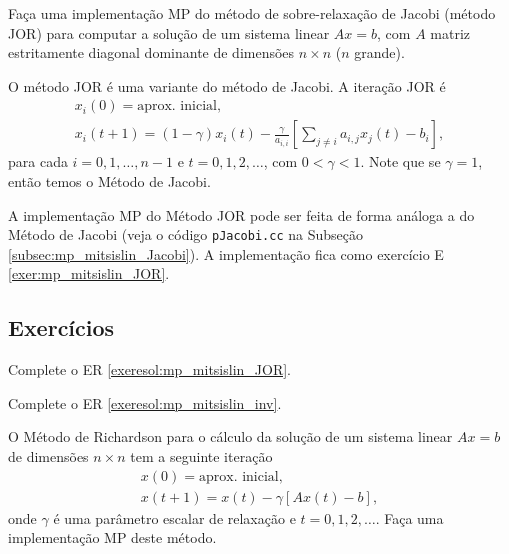 \begin{exeresol}\label{exeresol:mp_mitsislin_JOR}
  Faça uma implementação MP do método de sobre-relaxação de Jacobi (método JOR) para computar a solução de um sistema linear $Ax = b$, com $A$ matriz estritamente diagonal dominante de dimensões $n\times n$ ($n$ grande).
\end{exeresol}
\begin{resol}
  O método JOR é uma variante do método de Jacobi. A iteração JOR é
  \begin{gather}
    x_i(0) = \text{aprox. inicial},\\
    x_i(t+1) = (1-\gamma)x_i(t) -\frac{\gamma}{a_{i,i}}\left[\sum_{j\neq i}a_{i,j}x_j(t) - b_i\right],
  \end{gather}
  para cada $i=0,1,\dotsc,n-1$ e $t=0,1,2,\ldots$, com $0<\gamma<1$. Note que se $\gamma=1$, então temos o Método de Jacobi.

  A implementação MP do Método JOR pode ser feita de forma análoga a do Método de Jacobi (veja o código \verb+pJacobi.cc+ na Subseção \ref{subsec:mp_mitsislin_Jacobi}). A implementação fica como exercício E \ref{exer:mp_mitsislin_JOR}.
\end{resol}

\subsection*{Exercícios}

\begin{exer}\label{exer:mp_mitsislin_JOR}
  Complete o ER \ref{exeresol:mp_mitsislin_JOR}.
\end{exer}

\begin{exer}\label{exer:mp_mitsislin_inv}
  Complete o ER \ref{exeresol:mp_mitsislin_inv}.
\end{exer}

\begin{exer}
  O Método de Richardson para o cálculo da solução de um sistema linear $Ax = b$ de dimensões $n\times n$ tem a seguinte iteração
  \begin{gather}
    x(0) = \text{aprox. inicial},\\
    x(t+1) = x(t) - \gamma\left[Ax(t) - b\right],
  \end{gather}
  onde $\gamma$ é uma parâmetro escalar de relaxação e $t=0,1,2,\ldots$. Faça uma implementação MP deste método.
\end{exer}

